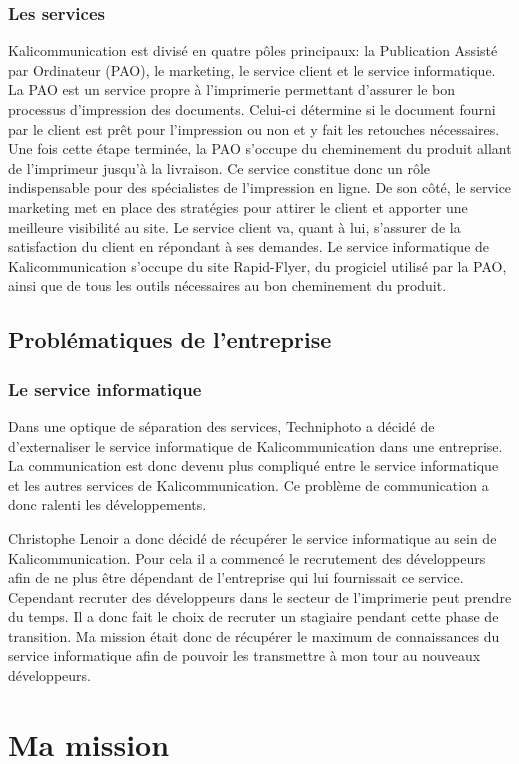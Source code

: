 \documentclass[a4paper]{report}
\begin{document}
\section{Les services}
Kalicommunication est divisé en quatre pôles principaux: la Publication Assisté par Ordinateur (PAO), le marketing, le service client et le service informatique.\newline
La PAO est un service propre à l'imprimerie permettant d'assurer le bon processus d'impression des documents. Celui-ci détermine si le document fourni par le client est prêt pour l'impression ou non et y fait les retouches nécessaires. Une fois cette étape terminée, la PAO s'occupe du cheminement du produit allant de l'imprimeur jusqu'à la livraison. Ce service constitue donc un rôle indispensable pour des spécialistes de l'impression en ligne.\newline
De son côté, le service marketing met en place des stratégies pour attirer le client et apporter une meilleure visibilité au site.\newline
Le service client va, quant à lui, s'assurer de la satisfaction du client en répondant à ses demandes.\newline
Le service informatique de Kalicommunication s'occupe du site Rapid-Flyer, du progiciel utilisé par la PAO, ainsi que de tous les outils nécessaires au bon cheminement du produit.
\chapter*{Problématiques de l'entreprise}
 
\setcounter{section}{0}

\section{Le service informatique}
Dans une optique de séparation des services, Techniphoto a décidé de d'externaliser le service informatique de Kalicommunication dans une entreprise. La communication est donc devenu plus compliqué entre le service informatique et les autres services de Kalicommunication. Ce problème de communication a donc ralenti les développements.

Christophe Lenoir a donc décidé de récupérer le service informatique au sein de Kalicommunication. Pour cela il a commencé le recrutement des développeurs afin de ne plus être dépendant de l'entreprise qui lui fournissait ce service. Cependant recruter des développeurs dans le secteur de l'imprimerie peut prendre du temps. Il a donc fait le choix de recruter un stagiaire pendant cette phase de transition. Ma mission était donc de récupérer le maximum de connaissances du service informatique afin de pouvoir les transmettre à mon tour au nouveaux développeurs.

\part{Ma mission}
\end{document}
